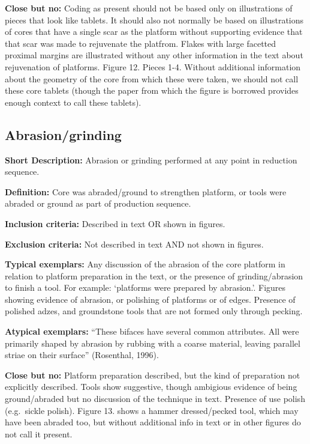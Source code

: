 \documentclass[
]{article}
\begin{document}
\textbf{Close but no:} Coding as present should not be based only on
illustrations of pieces that look like tablets. It should also not
normally be based on illustrations of cores that have a single scar as
the platform without supporting evidence that that scar was made to
rejuvenate the platfrom. Flakes with large facetted proximal margins are
illustrated without any other information in the text about rejuvenation
of platforms. Figure 12. Pieces 1-4. Without additional information
about the geometry of the core from which these were taken, we should
not call these core tablets (though the paper from which the figure is
borrowed provides enough context to call these tablets).

\hypertarget{abrasiongrinding}{%
\subsection{Abrasion/grinding}\label{abrasiongrinding}}

\textbf{Short Description:} Abrasion or grinding performed at any point
in reduction sequence.

\textbf{Definition:} Core was abraded/ground to strengthen platform, or
tools were abraded or ground as part of production sequence.

\textbf{Inclusion criteria:} Described in text OR shown in figures.

\textbf{Exclusion criteria:} Not described in text AND not shown in
figures.

\textbf{Typical exemplars:} Any discussion of the abrasion of the core
platform in relation to platform preparation in the text, or the
presence of grinding/abrasion to finish a tool. For example: `platforms
were prepared by abrasion.'. Figures showing evidence of abrasion, or
polishing of platforms or of edges. Presence of polished adzes, and
groundstone tools that are not formed only through pecking.

\textbf{Atypical exemplars:} ``These bifaces have several common
attributes. All were primarily shaped by abrasion by rubbing with a
coarse material, leaving parallel striae on their surface'' (Rosenthal,
1996).

\textbf{Close but no:} Platform preparation described, but the kind of
preparation not explicitly described. Tools show suggestive, though
ambigious evidence of being ground/abraded but no discussion of the
technique in text. Presence of use polish (e.g.~sickle polish). Figure
13. shows a hammer dressed/pecked tool, which may have been abraded too,
but without additional info in text or in other figures do not call it
present.
\end{document}
